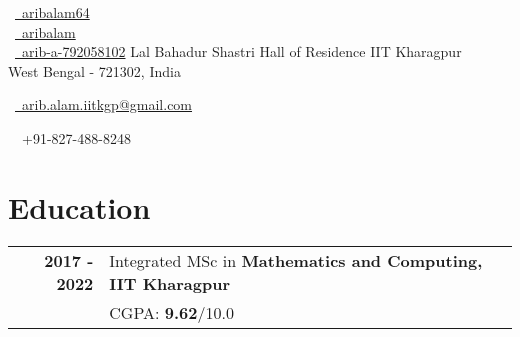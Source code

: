 \documentclass[a4paper,10pt]{article} %
\begin{document}
\pagestyle{empty} %



\par{\centering{\Huge \textcolor{sectiontitle}{Arib Alam}}\bigskip\par} %

\begin{multicols}{3}
\faMedium\ {\href{https://medium.com/@aribalam64}{\ aribalam64}}\\
\faGithub\ {\href{https://github.com/aribalam}{\ aribalam}}\\
\faLinkedinSquare\ {\href{https://www.linkedin.com/in/arib-a-792058102/}{\ arib-a-792058102}}
\vfill
\columnbreak
\centering Lal Bahadur Shastri Hall of Residence IIT Kharagpur\\
\centering West Bengal - 721302, India\\
\vfill
\columnbreak
\raggedright\hfill \faEnvelope\ {\href{mailto:arib.alam.iitkgp@gmail.com}{\ arib.alam.iitkgp@gmail.com}}\\
\raggedright\hfill \faPhone\ \ +91-827-488-8248\\
\end{multicols}


\section{\textcolor{sectiontitle}{Education}}

\begin{tabular}{r|l}	

\textbf{2017 - 2022} & Integrated MSc in \textbf{Mathematics and Computing, IIT Kharagpur}\\
&\normalsize \textsc{CGPA}: \textbf{9.62}/10.0\\

\end{tabular}

\end{document}
